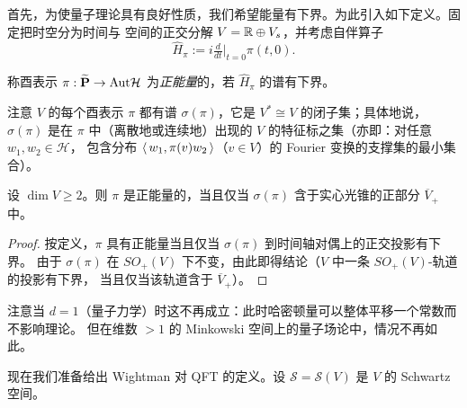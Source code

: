 首先，为使量子理论具有良好性质，我们希望能量有下界。为此引入如下定义。固定把时空分为时间与
空间的正交分解 $V= \Bbb R\oplus V_s$，并考虑自伴算子
$$
\widehat H_\pi:=i\tfrac{d}{dt}|_{t=0}\pi(t,0).
$$

\begin{definition} 称酉表示 $\pi: \widetilde {\bold P}\to {\rm Aut}\mathcal H$
为\emph{正能量}的，若 $\widehat H_\pi$ 的谱有下界。
\end{definition} 

注意 $V$ 的每个酉表示 $\pi$ 都有谱 $\sigma(\pi)$，它是 $V^*\cong V$ 的闭子集；具体地说，$\sigma(\pi)$
是在 $\pi$ 中（离散地或连续地）出现的 $V$ 的特征标之集（亦即：对任意 $w_1,w_2\in \mathcal H$，
包含分布 $\la w_1,\pi(v)w_2\ra$（$v\in V$）的 Fourier 变换的支撑集的最小集合）。

\begin{lemma} 设 $\dim V\ge 2$。则 $\pi$ 是正能量的，当且仅当 $\sigma(\pi)$ 含于实心光锥的正部分
$\overline V_+$ 中。
\end{lemma} 

\begin{proof} 按定义，$\pi$ 具有正能量当且仅当 $\sigma(\pi)$ 到时间轴对偶上的正交投影有下界。
由于 $\sigma(\pi)$ 在 $SO_+(V)$ 下不变，由此即得结论（$V$ 中一条 $SO_+(V)$-轨道的投影有下界，
当且仅当该轨道含于 $\overline V_+$）。
\end{proof} 

注意当 $d=1$（量子力学）时这不再成立：此时哈密顿量可以整体平移一个常数而不影响理论。
但在维数 $>1$ 的 Minkowski 空间上的量子场论中，情况不再如此。

现在我们准备给出 Wightman 对 QFT 的定义。设 $\mathcal S=\mathcal S(V)$ 是 $V$ 的 Schwartz 空间。

